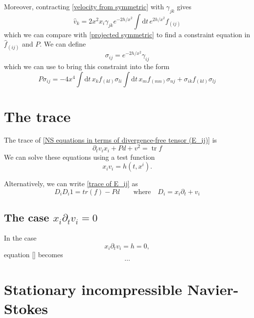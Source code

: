 \documentclass[10pt,a4paper]{article}
\newcommand{\ud}{\mathrm{d}}
\DeclareMathOperator{\tr}{tr}
\begin{document}
Moreover, contracting \eqref{velocity from symmetric} with $\gamma_{jk}$ gives
\begin{equation}
\hat v_k = 2x^2 x_i \gamma_{jk} e^{-2h/x^2} \int \ud t \, e^{2h/x^2} f_{(ij)}
\end{equation}
which we can compare with \eqref{projected symmetric} to find a constraint equation in $\hat f_{(ij)}$ and $P$. We can define
\begin{equation}
\sigma_{ij} = e^{-2h/x^2} \gamma_{ij}
\end{equation}
which we can use to bring this constraint into the form
\begin{equation}
P \sigma_{ij} = -4x^4 \int \ud t \, x_k f_{(kl)} \sigma_{li} \int \ud t \, x_m f_{(mn)} \sigma_{nj} + \sigma_{ik} f_{(kl)} \sigma_{lj}
\end{equation}

\section{The trace}

The trace of \eqref{NS equations in terms of divergence-free tensor (E_ij)} is
\begin{equation}
\partial_t v_i x_i + Pd + v^2 = \tr f
\label{trace of E_ij}
\end{equation}
We can solve these equations using a test function
\[
	x_i v_i = h(t,x^i).
\]

Alternatively, we can write \eqref{trace of E_ij} as
\begin{equation}
D_i D_i 1 = tr(f) - Pd
\qquad
\text{where}
\quad
D_i = x_i \partial_t + v_i
\end{equation}

\subsection{The case $x_i\partial_t v_i = 0$}
In the case
\begin{equation}
	x_i\partial_t v_i = h = 0		,
\end{equation}
equation \eqref{} becomes
\begin{equation}
	\ldots
\end{equation}




\section{Stationary incompressible Navier-Stokes}
\end{document}
